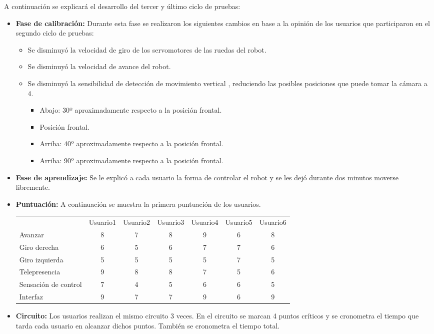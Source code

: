 \documentclass[twoside, 12pt]{epstfg}
\begin{document}
A continuación se explicará el desarrollo del tercer y último ciclo de pruebas:
\begin{itemize}
	\item \textbf{Fase de calibración:} Durante esta fase se realizaron los siguientes cambios en base a la opinión de los usuarios que participaron en el segundo ciclo de pruebas:
	\begin{itemize}
		\item Se disminuyó la velocidad de giro de los servomotores de las ruedas del robot.
		\item Se disminuyó la velocidad de avance del robot.
		\item Se disminuyó la sensibilidad de detección de movimiento vertical , reduciendo las posibles posiciones que puede tomar la cámara a 4.
		\begin{itemize}
			\item Abajo: 30º aproximadamente respecto a la posición frontal.
			\item Posición frontal.
			\item Arriba: 40º aproximadamente respecto a la posición frontal.
			\item Arriba: 90º aproximadamente respecto a la posición frontal.
		\end{itemize}
	\end{itemize}
	\item \textbf{Fase de aprendizaje:} Se le explicó a cada usuario la forma de controlar el robot y se les dejó durante dos minutos moverse libremente.
	\item \textbf{Puntuación: } A continuación se muestra la primera puntuación de los usuarios.
	
\begin{center}

\resizebox{15cm}{!} {
	\begin{tabular}{|g c c c c c c|}
		\hline
		 \\ \hline
		& Usuario1	&Usuario2	&Usuario3	&Usuario4	&Usuario5	&Usuario6 \\
		Avanzar
		 & 8 &7 &8 &9 &6 & 8\\
	Giro derecha
	 & 6 & 5 &6 &7 & 7& 6\\
		Giro izquierda
		 & 5 & 5&5 &5 &7 & 5\\
		Telepresencia
		 & 9 & 8 &8 & 7& 5& 6\\ 
		 Sensación de control
		 & 7 &4 &5 & 6&6 & 5\\
		 		 Interfaz
		 		 & 9 &7 & 7& 9& 6& 9\\
		 \hline
	\end{tabular}
}
\end{center}
\newpage
\item \textbf{Circuito:} Los usuarios realizan el mismo circuito 3 veces. En el circuito se marcan 4 puntos críticos y se cronometra el tiempo que tarda cada usuario en alcanzar dichos puntos. También se cronometra el tiempo total.


\end{itemize}
\end{document}
